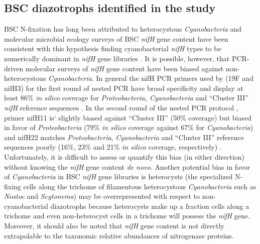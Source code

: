 \subsection{BSC diazotrophs identified in the study} BSC N-fixation has long
been attributed to heterocystous \textit{Cyanobacteria} and molecular microbial
ecology surveys of BSC \textit{nifH} gene content have been consistent with
this hypothesis finding cyanobacterial \textit{nifH} types to be numerically
dominant in \textit{nifH} gene libraries \citep{Yeager,14766579,Yeager_2012}.
It is possible, however, that PCR-driven molecular surveys of \textit{nifH}
gene content have been biased against non-heterocystous \textit{Cyanobacteria}.
In general the nifH PCR primers used by \citet{Yeager,14766579,Yeager_2012}
(19F and nifH3) for the first round of nested PCR have broad specificity and
display at least 86\% \textit{in silico} coverage for \textit{Proteobacteria,
Cyanobacteria} and ``Cluster III'' \textit{nifH} reference sequences
\citep{Gaby_2012}. In the second round of the nested PCR protocol
\citep{Yeager,14766579,Yeager_2012}, primer nifH11 is` slightly biased against
``Cluster III'' (50\% coverage) but biased in favor of \textit{Proteobacteria}
(79\% \textit{in silico} coverage against 67\% for \textit{Cyanobacteria}) and
nifH22 matches \textit{Proteobacteria}, \textit{Cyanobacteria} and ``Cluster
III'' reference sequences poorly (16\%, 23\% and 21\% \textit{in silico}
coverage, respectively) \citep{Gaby_2012}.  Unfortunately, it is difficult to
assess or quantify this bias (in either direction) without knowing the
\textit{nifH} gene content \textit{de novo}. Another potential bias in favor of
\textit{Cyanobacteria} in BSC \textit{nifH} gene libraries is heterocysts (the
specialized N-fixing cells along the trichome of filamentous heterocystous
\textit{Cyanobacteria} such as \textit{Nostoc} and \textit{Scytonema}) may be
overrepresented with respect to non-cyanobacterial diazotrophs because
heterocysts make up a fraction cells along a trichome and even non-heterocyst
cells in a trichome will possess the \textit{nifH} gene. Moreover, it should
also be noted that \textit{nifH} gene content is not directly extrapolable to
the taxonomic relative abundances of nitrogenase proteins.


